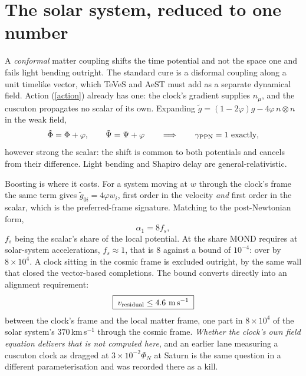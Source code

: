 \documentclass[11pt,letterpaper]{article}
\begin{document}
\section{The solar system, reduced to one number}
A \emph{conformal} matter coupling shifts the time potential and not the space one and fails light bending outright. The standard cure is a disformal coupling along a unit timelike vector, which TeVeS \cite{teves} and AeST \cite{aest} must add as a separate dynamical field. Action (\ref{action}) already has one: the clock's gradient supplies $n_\mu$, and the cuscuton \cite{cuscuton} propagates no scalar of its own. Expanding $\tilde g=(1-2\varphi)g-4\varphi\,n\otimes n$ in the weak field,
\begin{equation}
\tilde\Phi=\Phi+\varphi,\qquad \tilde\Psi=\Psi+\varphi\qquad\Longrightarrow\qquad \gamma_{\rm PPN}=1\ \text{exactly},
\end{equation}
however strong the scalar: the shift is common to both potentials and cancels from their difference. Light bending and Shapiro delay are general-relativistic.

Boosting is where it costs. For a system moving at $w$ through the clock's frame the same term gives $\tilde g_{0i}=4\varphi w_i$, first order in the velocity \emph{and} first order in the scalar, which is the preferred-frame signature. Matching to the post-Newtonian form,
\begin{equation}
\alpha_1=8f_s ,
\end{equation}
$f_s$ being the scalar's share of the local potential. At the share MOND requires at solar-system accelerations, $f_s\approx1$, that is $8$ against a bound of $10^{-4}$: over by $8\times10^4$. A clock sitting in the cosmic frame is excluded outright, by the same wall that closed the vector-based completions. The bound converts directly into an alignment requirement:
\begin{equation}
\boxed{\;v_{\rm residual}\le4.6\ \text{m\,s}^{-1}\;}
\end{equation}
between the clock's frame and the local matter frame, one part in $8\times10^4$ of the solar system's $370\,$km$\,$s$^{-1}$ through the cosmic frame. \emph{Whether the clock's own field equation delivers that is not computed here}, and an earlier lane measuring a cuscuton clock as dragged at $3\times10^{-2}\Phi_N$ at Saturn \cite{paper13} is the same question in a different parameterisation and was recorded there as a kill.
\end{document}
